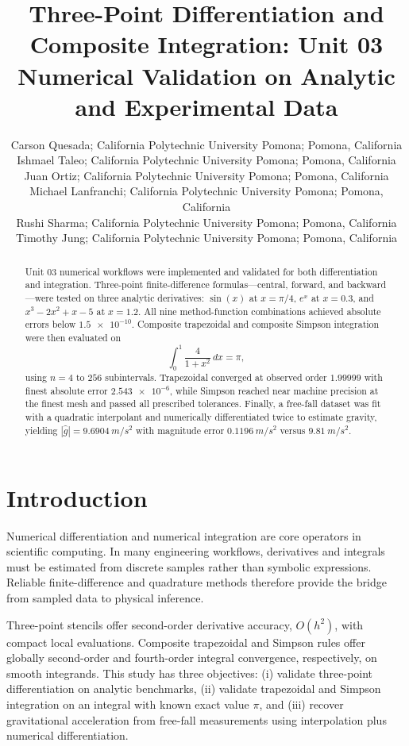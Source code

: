 \documentclass[letterpaper,twocolumn,fleqn]{article}
\title{Three-Point Differentiation and Composite Integration: Unit 03 Numerical Validation on Analytic and Experimental Data}
\author{
Carson Quesada; California Polytechnic University Pomona; Pomona, California \\
Ishmael Taleo; California Polytechnic University Pomona; Pomona, California \\
Juan Ortiz; California Polytechnic University Pomona; Pomona, California \\
Michael Lanfranchi; California Polytechnic University Pomona; Pomona, California \\
Rushi Sharma; California Polytechnic University Pomona; Pomona, California \\
Timothy Jung; California Polytechnic University Pomona; Pomona, California
}
\date{}
\begin{document}
\maketitle
\thispagestyle{empty}

\begin{abstract}
Unit 03 numerical workflows were implemented and validated for both differentiation and integration. Three-point finite-difference formulas---central, forward, and backward---were tested on three analytic derivatives: $\sin(x)$ at $x=\pi/4$, $e^{x}$ at $x=0.3$, and $x^{3}-2x^{2}+x-5$ at $x=1.2$. All nine method-function combinations achieved absolute errors below $\num{1.5e-10}$. Composite trapezoidal and composite Simpson integration were then evaluated on
\[
\int_{0}^{1} \frac{4}{1+x^2}\,dx=\pi,
\]
using $n=4$ to $256$ subintervals. Trapezoidal converged at observed order $1.99999$ with finest absolute error $\num{2.543e-6}$, while Simpson reached near machine precision at the finest mesh and passed all prescribed tolerances. Finally, a free-fall dataset was fit with a quadratic interpolant and numerically differentiated twice to estimate gravity, yielding $|\hat{g}|=\qty{9.6904}{m/s^2}$ with magnitude error $\qty{0.1196}{m/s^2}$ versus $\qty{9.81}{m/s^2}$.
\end{abstract}

\section{Introduction}
\label{sec:intro}
Numerical differentiation and numerical integration are core operators in scientific computing. In many engineering workflows, derivatives and integrals must be estimated from discrete samples rather than symbolic expressions. Reliable finite-difference and quadrature methods therefore provide the bridge from sampled data to physical inference.

Three-point stencils offer second-order derivative accuracy, $O(h^{2})$, with compact local evaluations. Composite trapezoidal and Simpson rules offer globally second-order and fourth-order integral convergence, respectively, on smooth integrands. This study has three objectives: (i) validate three-point differentiation on analytic benchmarks, (ii) validate trapezoidal and Simpson integration on an integral with known exact value $\pi$, and (iii) recover gravitational acceleration from free-fall measurements using interpolation plus numerical differentiation.
\end{document}
